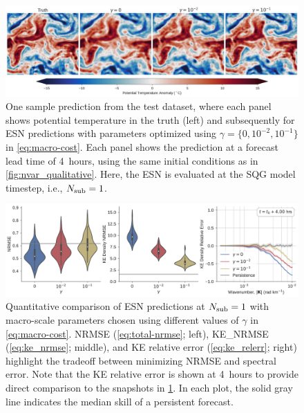 \begin{figure}
    \centering
    \includegraphics[width=\textwidth]{../figures/rc_qualitative_gamma.jpg}
    \caption{
        One sample prediction from the test dataset, where each panel shows
        potential temperature in the truth (left) and subsequently for
        ESN predictions with parameters optimized using
        $\gamma=\{0, 10^{-2}, 10^{-1}\}$ in \cref{eq:macro-cost}.
        Each panel shows the prediction at a forecast lead time of 4~hours,
        using the same initial conditions as in \cref{fig:nvar_qualitative}.
        Here, the ESN is evaluated at the SQG model timestep, i.e., $N_\text{sub}=1$.
    }
    \label{fig:rc_qualitative_nsub01}
\end{figure}

\begin{figure}
    \centering
    \includegraphics[width=\textwidth]{../figures/rc_all_nsub01.pdf}
    \caption{
        Quantitative comparison of ESN predictions at $N_\text{sub}=1$ with macro-scale
        parameters
        chosen using different values of $\gamma$ in \cref{eq:macro-cost}.
        NRMSE (\cref{eq:total-nrmse}; left), KE\_NRMSE (\cref{eq:ke_nrmse};
        middle), and
        KE relative error (\cref{eq:ke_relerr}; right) highlight the tradeoff
        between minimizing NRMSE and spectral error.
        Note that the KE relative error is shown at 4~hours to provide
        direct comparison to the snapshots in \cref{fig:rc_qualitative_nsub01}.
        In each plot, the solid gray line indicates the median skill of a persistent
        forecast.
    }
    \label{fig:rc_quantiative_nsub01}
\end{figure}



